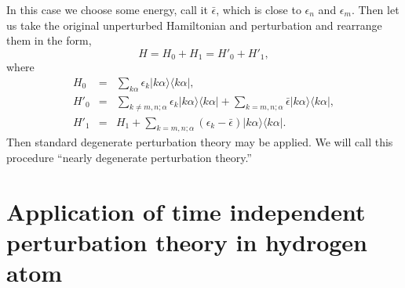 In this case we choose some energy, call it $\bar{\epsilon}$, which is close to $\epsilon_n$ and $\epsilon_m$. Then let us take the original unperturbed Hamiltonian and perturbation and rearrange them in the form,
\[H = H_0 + H_1 = H'_0 + H'_1,\]
where
\begin{eqnarray}
H_0 &=& \sum_{k\alpha} \epsilon_k |k\alpha\rangle\langle k\alpha| ,\nonumber \\
H'_0 &=& \sum_{k\neq m,n; \alpha} \epsilon_k |k\alpha\rangle\langle k\alpha| + \sum_{k= m,n; \alpha} \bar{\epsilon} |k\alpha\rangle\langle k\alpha| ,\nonumber \\
H'_1 &=& H_1 + \sum_{k= m,n; \alpha} (\epsilon_k - \bar{\epsilon} )|k\alpha\rangle\langle k\alpha| .\nonumber
\end{eqnarray}
Then standard degenerate perturbation theory may be applied.
We will call this procedure ``nearly degenerate perturbation theory.''

\section{Application of time independent perturbation theory in hydrogen atom}

